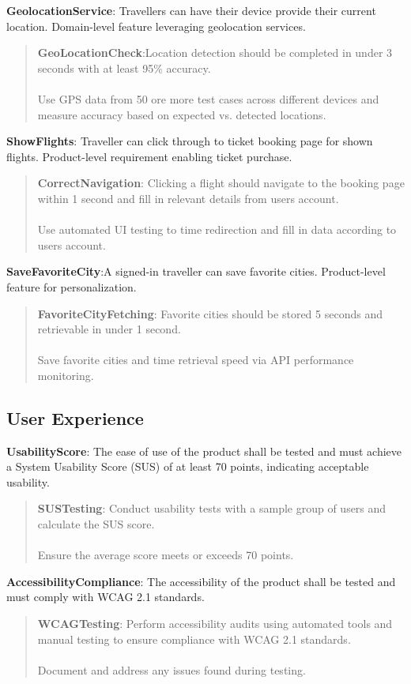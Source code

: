 \textbf{GeolocationService}: Travellers can have their device provide their current location. Domain-level feature leveraging geolocation services.
\begin{quote}
    \textbf{GeoLocationCheck}:Location detection should be completed in under 3 seconds with at least 95\% accuracy.\\ \\
    Use GPS data from 50 ore more test cases across different devices and measure accuracy based on expected vs. detected locations.
\end{quote}
\textbf{ShowFlights}: Traveller can click through to ticket booking page for shown flights. Product-level requirement enabling ticket purchase.
    \begin{quote}
        \textbf{CorrectNavigation}: Clicking a flight should navigate to the booking page within 1 second and fill in relevant details from users account. \\ \\
        Use automated UI testing to time redirection and fill in data according to users account.
    \end{quote}
\textbf{SaveFavoriteCity}:A signed-in traveller can save favorite cities. Product-level feature for personalization.
\begin{quote}
    \textbf{FavoriteCityFetching}: Favorite cities should be stored 5 seconds and retrievable in under 1 second. \\ \\
    Save favorite cities and time retrieval speed via API performance monitoring.
\end{quote}

\subsection{User Experience}
\textbf{UsabilityScore}: The ease of use of the product shall be tested and must achieve a System Usability Score (SUS) of at least 70 points, indicating acceptable usability.
\begin{quote}
    \textbf{SUSTesting}: Conduct usability tests with a sample group of users and calculate the SUS score. \\ \\
    Ensure the average score meets or exceeds 70 points.
\end{quote}

\textbf{AccessibilityCompliance}: The accessibility of the product shall be tested and must comply with WCAG 2.1 standards.
\begin{quote}
    \textbf{WCAGTesting}: Perform accessibility audits using automated tools and manual testing to ensure compliance with WCAG 2.1 standards. \\ \\
    Document and address any issues found during testing.
\end{quote}

